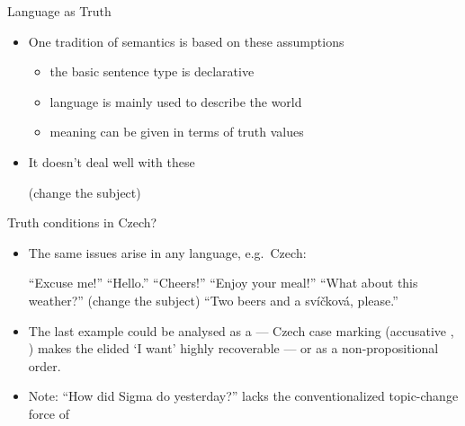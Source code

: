 \documentclass{beamer}
\begin{document}
\begin{frame}{Language as Truth}
\begin{itemize}
\item One tradition of semantics is based on these assumptions
  \begin{itemize}
  \item the basic sentence type is declarative
  \item language is mainly used to describe the world
  \item meaning can be given in terms of truth values
  \end{itemize}
\item It doesn't deal well with these
  \begin{exe}
    \ex {}
    \ex {}
    \ex {}
    \ex {}
    \ex {} \hfill (change the subject)
  \end{exe}
\end{itemize}

\end{frame}

\begin{frame}{Truth conditions in Czech?}
\begin{itemize}
\item The same issues arise in any language, e.g.\ Czech:
  \begin{exe}
    \ex {} ``Excuse me!''
    \ex {} ``Hello.''
    \ex {} ``Cheers!''
    \ex {} ``Enjoy your meal!''
    \ex {} ``What about this weather?'' \hfill (change the subject)
    \ex {} ``Two beers and a svíčková, please.''
  \end{exe}
\item The last example could be analysed as a  --- Czech case marking
  (accusative , ) makes the elided \eng{[Chci]} `I want' highly
  recoverable --- or as a non-propositional order.
\item Note:  ``How did Sigma do yesterday?''  lacks the conventionalized topic-change force of 
\end{itemize}
\end{frame}
\end{document}
